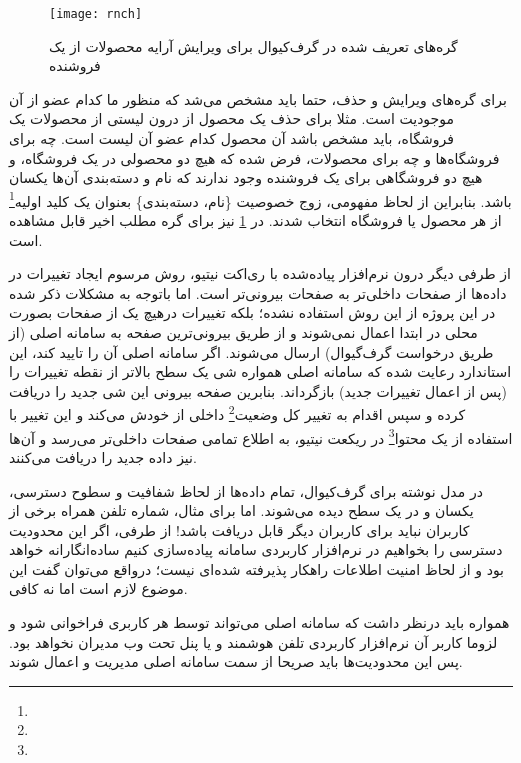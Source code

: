 \begin{figure}[H]
	\centering
	\texttt{[image: rnch]}
	\caption{گره‌های تعریف شده در گرف‌کیوال برای ویرایش آرایه محصولات از یک فروشنده}
	\label{fig:rnch}
\end{figure}

برای گره‌های ویرایش و حذف، حتما باید مشخص می‌شد که منظور ما کدام عضو از آن موجودیت است. مثلا برای حذف یک محصول از درون لیستی از محصولات یک فروشگاه، باید مشخص باشد آن محصول کدام عضو آن لیست است. چه برای فروشگاه‌ها و چه برای محصولات، فرض شده که هیچ دو محصولی در یک فروشگاه، و هیچ دو فروشگاهی برای یک فروشنده وجود ندارند که نام و دسته‌بندی آن‌ها یکسان باشد. بنابراین از لحاظ مفهومی، زوج خصوصیت \{نام، دسته‌بندی\} بعنوان یک کلید اولیه\footnote{} از هر محصول یا فروشگاه انتخاب شدند. در \cref{fig:rnch} نیز برای گره  مطلب اخیر قابل مشاهده است.

از طرفی دیگر درون نرم‌افزار پیاده‌شده با ری‌اکت نیتیو، روش مرسوم ایجاد تغییرات در داده‌ها از صفحات داخلی‌تر به صفحات بیرونی‌تر است. اما باتوجه به مشکلات ذکر شده در این پروژه از این روش استفاده نشده؛ بلکه تغییرات درهیچ یک از صفحات بصورت محلی در ابتدا اعمال نمی‌شوند و از طریق بیرونی‌ترین صفحه به سامانه اصلی (از طریق درخواست گرف‌گیوال) ارسال می‌شوند. اگر سامانه اصلی آن را تایید کند، این استاندارد رعایت شده که سامانه اصلی همواره شی یک سطح بالاتر از نقطه تغییرات را (پس از اعمال تغییرات جدید) بازگرداند. بنابرین صفحه بیرونی این شی جدید را دریافت کرده و سپس اقدام به تغییر کل وضعیت\footnote{} داخلی از خودش می‌کند و این تغییر با استفاده از یک محتوا\footnote{} در ریکعت نیتیو، به اطلاع تمامی صفحات داخلی‌تر می‌رسد و آن‌ها نیز داده جدید را دریافت می‌کنند\cite{react:hooks}.


در مدل نوشته برای گرف‌کیوال، تمام داده‌ها از لحاظ شفافیت و سطوح دسترسی، یکسان و در یک سطح دیده می‌شوند. اما برای مثال، شماره تلفن همراه برخی از کاربران نباید برای کاربران دیگر قابل دریافت باشد! از طرفی،‌ اگر این محدودیت دسترسی را بخواهیم در نرم‌افزار کاربردی سامانه پیاده‌سازی کنیم ساده‌انگارانه خواهد بود و از لحاظ امنیت اطلاعات راهکار پذیرفته شده‌ای نیست؛ درواقع می‌توان گفت این موضوع لازم است اما نه کافی.

همواره باید درنظر داشت که سامانه اصلی می‌تواند توسط هر کاربری فراخوانی شود و لزوما کاربر آن نرم‌افزار کاربردی تلفن هوشمند و یا پنل تحت وب مدیران نخواهد بود. پس این محدودیت‌ها باید صریحا از سمت سامانه اصلی مدیریت و اعمال شوند.

